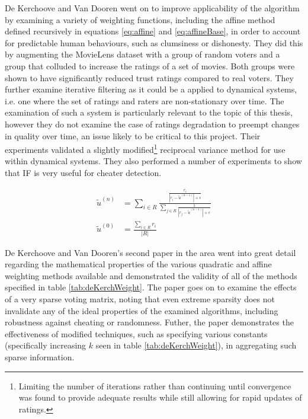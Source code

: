 De Kerchoove and Van Dooren \cite{de2007iterative} went on to improve applicability of the algorithm by examining a variety of weighting functions, including the affine method defined recursively in equations \ref{eq:affine} and \ref{eq:affineBase}, in order to account for predictable human behaviours, such as clumsiness or dishonesty. They did this by augmenting the MovieLens dataset with a group of random voters and a group that colluded to increase the ratings of a set of movies. Both groups were shown to have significantly reduced trust ratings compared to real voters.
They further examine iterative filtering as it could be a applied to dynamical systems, i.e. one where the set of ratings and raters are non-stationary over time. The examination of such a system is particularly relevant to the topic of this thesis, however they do not examine the case of ratings degradation to preempt changes in quality over time, an issue likely to be critical to this project.  Their experiments validated a slightly modified\footnote{Limiting the number of iterations rather than continuing until convergence was found to provide adequate results while still allowing for rapid updates of ratings.} reciprocal variance method for use within dynamical systems. They also performed a number of experiments to show that IF is very useful for cheater detection. 

\begin{align}
    \tilde{u}^{(n)} &= \sum\limits_{i \in R}\frac{\frac{r_i}{|r_i-\tilde{u}^{(n-1)}|+\epsilon}}{\sum\limits_{j\in R} \frac{1}{|r_j-\tilde{u}^{(n-1)}|+\epsilon}} \label{eq:affine} \\
    \tilde{u}^{(0)} &= \frac{\sum\limits_{i\in R} r_i}{|R|}\label{eq:affineBase}
\end{align}


De Kerchoove and Van Dooren's \cite{de2010iterative} second paper in the area went into great detail regarding the mathematical properties of the various quadratic and affine weighting methods available and demonstrated the validity of all of the methods specified in table \ref{tab:deKerchWeight}. The paper goes on to examine the effects of a very sparse voting matrix, noting that even extreme sparsity does not invalidate any of the ideal properties of the examined algorithms, including robustness against cheating or randomness. Futher, the paper demonstrates the effectiveness of modified techniques, such as specifying various constants (specifically increasing $k$ seen in table \ref{tab:deKerchWeight}), in aggregating such sparse information.

